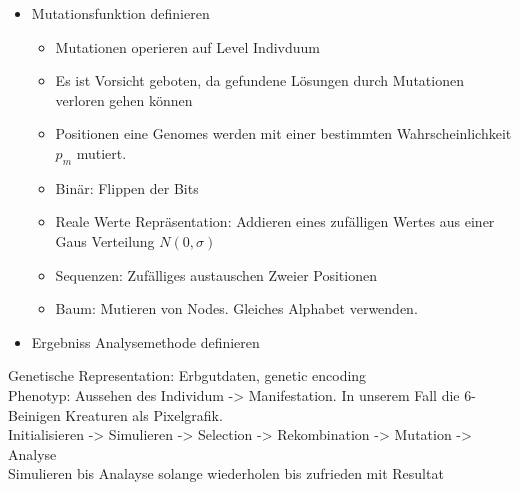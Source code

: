 \begin{itemize}
      \item Mutationsfunktion definieren
        \begin{itemize}
          \item Mutationen operieren auf Level Indivduum
          \item Es ist Vorsicht geboten, da gefundene Lösungen durch Mutationen verloren gehen können
          \item Positionen eine Genomes werden mit einer bestimmten Wahrscheinlichkeit \(p_{m}\) mutiert.
          \item Binär: Flippen der Bits
          \item Reale Werte Repräsentation: Addieren eines zufälligen Wertes aus einer Gaus Verteilung \(N(0,\sigma)\)
          \item Sequenzen: Zufälliges austauschen Zweier Positionen
          \item Baum: Mutieren von Nodes. Gleiches Alphabet verwenden.
        \end{itemize}

      \item Ergebniss Analysemethode definieren
    \end{itemize}

    Genetische Representation: Erbgutdaten, genetic encoding \\
    Phenotyp: Aussehen des Individum -> Manifestation. In unserem Fall die 6-Beinigen Kreaturen als Pixelgrafik. \\
    Initialisieren -> Simulieren -> Selection -> Rekombination -> Mutation -> Analyse \\
    Simulieren bis Analayse solange wiederholen bis zufrieden mit Resultat


